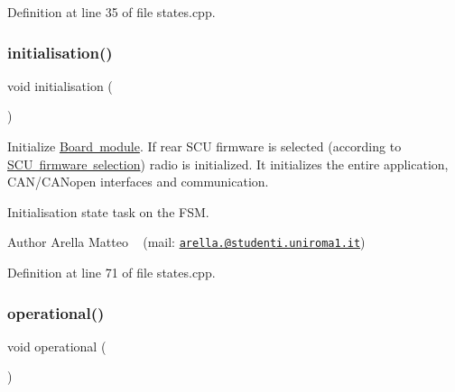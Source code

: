 Definition at line 35 of file states.\+cpp.

\mbox{\label{group___c_a_nopen___f_s_m__module_gadfffb3be7aa80aea898ada67e93d2388}} 
\subsubsection{\texorpdfstring{initialisation()}{initialisation()}}
{\footnotesize\ttfamily void initialisation (\begin{DoxyParamCaption}{ }\end{DoxyParamCaption})}



Initialize \mbox{\hyperlink{group___board__model__group}{Board module}}. If rear S\+CU firmware is selected (according to \mbox{\hyperlink{group___s_c_u__firmware__selection}{S\+CU firmware selection}}) radio is initialized. It initializes the entire application, C\+A\+N/\+C\+A\+Nopen interfaces and communication. 

Initialisation state task on the F\+SM.

\begin{DoxyAuthor}{Author}
Arella Matteo ~\newline
 (mail\+: \href{mailto:arella.1646983@studenti.uniroma1.it}{\tt arella.@studenti.\+uniroma1.\+it}) 
\end{DoxyAuthor}


Definition at line 71 of file states.\+cpp.

\mbox{\label{group___c_a_nopen___f_s_m__module_ga003b28d176774c489577f471a7b5f946}} 
\subsubsection{\texorpdfstring{operational()}{operational()}}
{\footnotesize\ttfamily void operational (\begin{DoxyParamCaption}{ }\end{DoxyParamCaption})}



